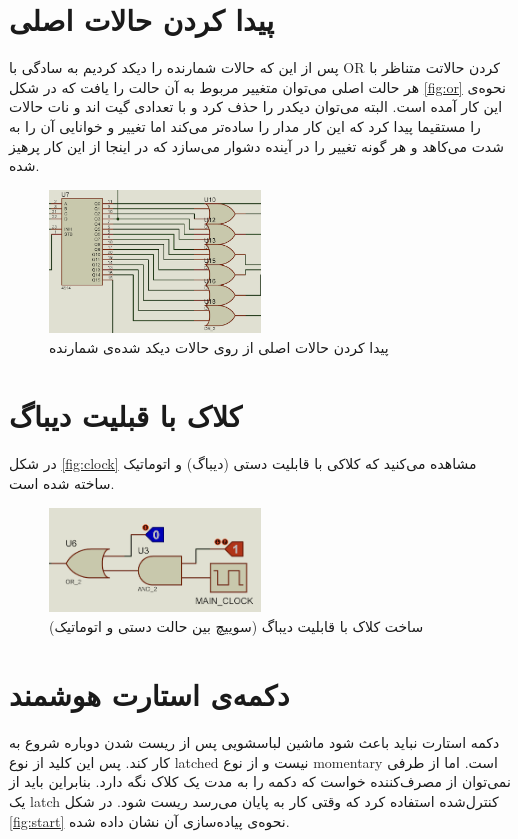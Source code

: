 \section{
پیدا کردن حالات اصلی
}

پس از این که حالات شمارنده را دیکد کردیم به سادگی با OR
کردن حالاتت متناظر با هر حالت اصلی می‌توان متغییر مربوط به آن حالت را یافت که در شکل
\eqref{fig:or}
نحوه‌ی این کار آمده است.
البته می‌توان دیکدر را حذف کرد و با تعدادی گیت اند و نات حالات را مستقیما پیدا کرد که این کار مدار را ساده‌تر می‌کند اما تغییر و خوانایی آن را به شدت می‌کاهد و هر گونه تغییر را در آینده دشوار می‌سازد که در اینجا از این کار پرهیز شده.

\begin{figure}[h!]
    \centering
    \includegraphics[width=0.5\textwidth]{part1/3.png}
    \caption{
    پیدا کردن حالات اصلی از روی حالات دیکد شده‌ی شمارنده
    }
    \label{fig:or}
\end{figure}

\section{
 کلاک با قبلیت دیباگ
}
در شکل
\eqref{fig:clock}
مشاهده می‌کنید که کلاکی با قابلیت دستی (دیباگ) و اتوماتیک
ساخته شده است.

\begin{figure}[h!]
    \centering
    \includegraphics[width=0.5\textwidth]{part1/4.png}
    \caption{
    ساخت کلاک با قابلیت دیباگ (سوییچ بین حالت دستی و اتوماتیک)
    }
    \label{fig:clock}
\end{figure}

\section{
دکمه‌ی استارت هوشمند
}
دکمه استارت نباید باعث شود ماشین لباسشویی پس از ریست شدن دوباره شروع به کار کند.
پس این کلید از نوع
latched
نیست و از نوع
momentary 
است.
اما از طرفی نمی‌توان از مصرف‌کننده خواست که دکمه را به مدت یک کلاک نگه دارد.
بنابراین باید از یک 
latch 
کنترل‌شده
استفاده کرد که وقتی کار به پایان می‌رسد ریست شود.
در شکل \eqref{fig:start}
نحوه‌ی پیاده‌سازی آن نشان داده شده.


